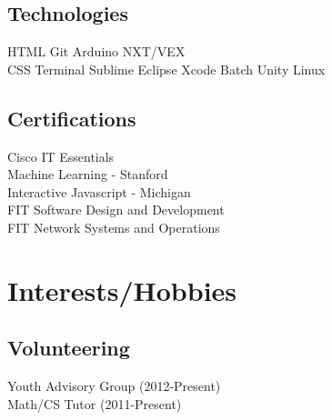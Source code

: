 \documentclass[]{deedy-resume-openfont}
\begin{document}
\begin{minipage}[t]{0.33\textwidth}
\subsection{Technologies}
HTML \textbullet{} Git  \textbullet{} Arduino \textbullet{} NXT/VEX
\\ 
\vspace{1mm}
CSS \textbullet{} Terminal  \textbullet{} Sublime \textbullet{} Eclipse \textbullet{} Xcode \textbullet{} Batch \textbullet{} Unity \textbullet{} Linux

\sectionsep

\subsection{Certifications}
\textbullet{} Cisco IT Essentials\\
\textbullet{} Machine Learning - Stanford \\
\textbullet{} Interactive Javascript - Michigan \\
\textbullet{} FIT Software Design and Development \\
\textbullet{} FIT Network Systems and Operations \\
\sectionsep
\vspace{2mm}

\section{Interests/Hobbies}

\subsection{Volunteering}
\textbullet{} Youth Advisory Group (2012-Present)\\
\textbullet{} Math/CS Tutor (2011-Present)\\
\vspace{2mm}


\end{minipage}
\end{document}
